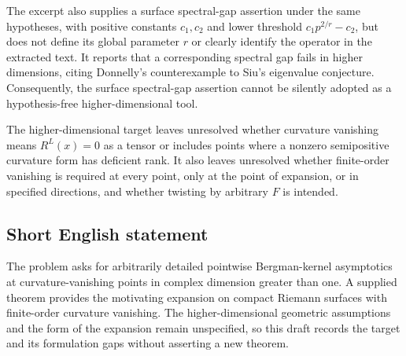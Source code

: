 \documentclass[11pt]{article}
\begin{document}
The excerpt also supplies a surface spectral-gap assertion under the same hypotheses, with positive constants \(c_1,c_2\) and lower threshold \(c_1p^{2/r}-c_2\), but does not define its global parameter \(r\) or clearly identify the operator in the extracted text. It reports that a corresponding spectral gap fails in higher dimensions, citing Donnelly's counterexample to Siu's eigenvalue conjecture. Consequently, the surface spectral-gap assertion cannot be silently adopted as a hypothesis-free higher-dimensional tool.

The higher-dimensional target leaves unresolved whether curvature vanishing means \(R^L(x)=0\) as a tensor or includes points where a nonzero semipositive curvature form has deficient rank. It also leaves unresolved whether finite-order vanishing is required at every point, only at the point of expansion, or in specified directions, and whether twisting by arbitrary \(F\) is intended.
\subsection{Short English statement}
The problem asks for arbitrarily detailed pointwise Bergman-kernel asymptotics at curvature-vanishing points in complex dimension greater than one. A supplied theorem provides the motivating expansion on compact Riemann surfaces with finite-order curvature vanishing. The higher-dimensional geometric assumptions and the form of the expansion remain unspecified, so this draft records the target and its formulation gaps without asserting a new theorem.
\end{document}
